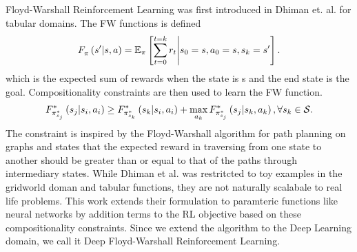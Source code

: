 Floyd-Warshall Reinforcement Learning was first introduced in Dhiman et.
al. for tabular domains. 
The FW functions is defined 
%
\begin{align}
F_{\pi}^{}\left({s'}\middle|{s}, {a}\right) =
\mathbb{E}_{\pi}\left[ \sum_{t=0}^{t=k} r_t \middle\vert s_0 = s, a_0 = s, s_k = s' \right] .
\end{align}%
%
which is the expected sum of rewards when the state is s and the
end state is the goal. Compositionality constraints are then used to
learn the FW function.
%
\begin{align}
\fwargs{\state_i}{\act_i}{\state_j}{\policy^*_{\state_j}}{*}
 \ge 
  \fwargs{\state_i}{\act_i}{\state_k}{\policy^*_{\state_k}}{*}
  + \max_{\act_k}\fwargs{\state_k}{\act_k}{\state_j}{\policy^*_{\state_j}}{*}
  ,\forall \state_k \in \State.
  \label{eq:fwconstraint}
\end{align}%
%
The constraint is inspired by the Floyd-Warshall algorithm for path
planning on graphs and states that the expected reward in traversing
from one state to another should be greater than or equal to that of the
paths through intermediary states.  While Dhiman et al. was restritcted
to toy examples in the gridworld doman and tabular functions, they are
not naturally scalabale to real life problems. This work extends their
formulation to paramteric functions like neural networks by addition
terms to the RL objective based on these compositionality constraints.
Since we extend the algorithm to the Deep Learning domain, we call it
Deep Floyd-Warshall Reinforcement Learning. 






